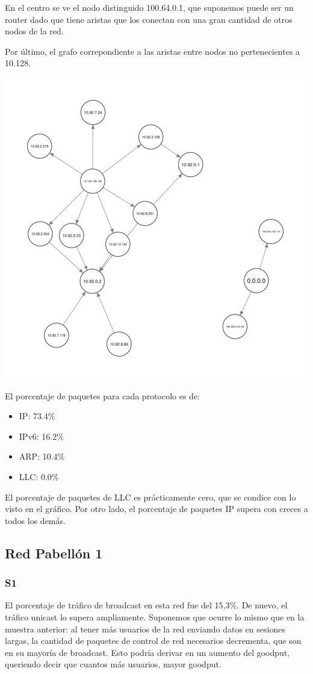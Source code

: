 En el centro se ve el nodo distinguido 100.64.0.1, que suponemos puede
ser un router dado que tiene aristas que los conectan con una gran
cantidad de otros nodos de la red. 

Por último, el grafo correpondiente a las aristas entre nodos no
pertenecientes a 10.128.

\includegraphics[scale=0.6]{../img/biblio-grafo-red-10-92.png}



El porcentaje de paquetes para cada protocolo es de:
\begin{itemize}
\item IP: 73.4\%
\item IPv6: 16.2\%
\item ARP: 10.4\%
\item LLC: 0.0\%
\end{itemize}

El porcentaje de paquetes de LLC es prácticamente cero, que se condice con lo
visto en el gráfico. Por otro lado, el porcentaje de paquetes IP supera con
creces a todos los demás.


\subsection{Red Pabellón 1}
\subsubsection{S1}
El porcentaje de tráfico de broadcast en esta red fue del 15,3\%. De nuevo, el
tráfico unicast lo supera ampliamente. Suponemos que ocurre lo mismo que en 
la muestra anterior: al tener más usuarios de la red enviando datos en 
sesiones largas, la cantidad de paquetes de control de red necesarios 
decrementa, que son en su mayoría de broadcast.
Esto podría derivar en un aumento del goodput, queriendo decir que cuantos 
más usuarios, mayor goodput.

